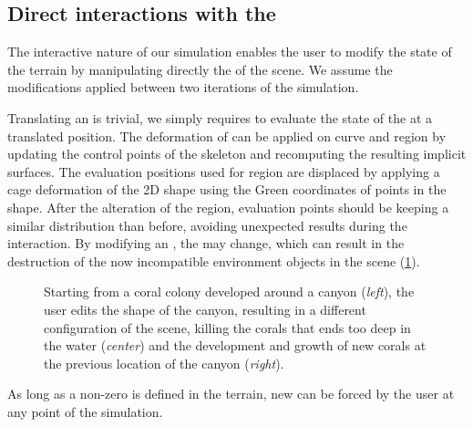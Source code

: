 \subsection{Direct interactions with the }
\label{sec:env-obj_manual-interaction}
The interactive nature of our simulation enables the user to modify the state of the terrain by manipulating directly the  of the scene. We assume the modifications applied between two iterations of the simulation.

Translating an  is trivial, we simply requires to evaluate the state of the  at a translated position. The deformation of  can be applied on curve and region  by updating the control points of the skeleton and recomputing the resulting implicit surfaces. The evaluation positions used for region  are displaced by applying a cage deformation of the 2D shape using the Green coordinates of points in the shape. After the alteration of the region, evaluation points should be keeping a similar distribution than before, avoiding unexpected results during the interaction.
By modifying an , the  may change, which can result in the destruction of the now incompatible environment objects in the scene (\cref{fig:env-obj_user-interaction}).

\begin{figure}
    \caption{Starting from a coral colony developed around a canyon (\textit{left}), the user edits the shape of the canyon, resulting in a different configuration of the scene, killing the corals that ends too deep in the water (\textit{center}) and the development and growth of new corals at the previous location of the canyon (\textit{right}). }
    \label{fig:env-obj_user-interaction}
\end{figure}

As long as a non-zero  is defined in the terrain, new  can be forced by the user at any point of the simulation. 

